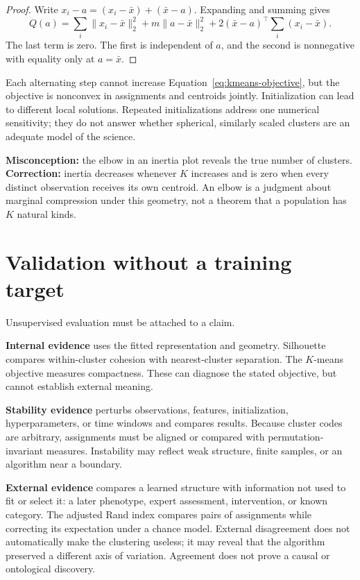 \begin{proof}
Write $x_i-a=(x_i-\bar x)+(\bar x-a)$. Expanding and summing gives
\[
Q(a)=\sum_i\lVert x_i-\bar x\rVert_2^2
+m\lVert a-\bar x\rVert_2^2
+2(\bar x-a)^\top\sum_i(x_i-\bar x).
\]
The last term is zero. The first is independent of $a$, and the second is
nonnegative with equality only at $a=\bar x$.
\end{proof}

Each alternating step cannot increase Equation~\eqref{eq:kmeans-objective}, but
the objective is nonconvex in assignments and centroids jointly. Initialization
can lead to different local solutions. Repeated initializations address one
numerical sensitivity; they do not answer whether spherical, similarly scaled
clusters are an adequate model of the science.

\begin{misconceptionbox}
\textbf{Misconception:} the elbow in an inertia plot reveals the true number of
clusters. \textbf{Correction:} inertia decreases whenever $K$ increases and is
zero when every distinct observation receives its own centroid. An elbow is a
judgment about marginal compression under this geometry, not a theorem that a
population has $K$ natural kinds.
\end{misconceptionbox}

\section{Validation without a training target}

Unsupervised evaluation must be attached to a claim.

\textbf{Internal evidence} uses the fitted representation and geometry.
Silhouette compares within-cluster cohesion with nearest-cluster separation.
The $K$-means objective measures compactness. These can diagnose the stated
objective, but cannot establish external meaning.

\textbf{Stability evidence} perturbs observations, features, initialization,
hyperparameters, or time windows and compares results. Because cluster codes
are arbitrary, assignments must be aligned or compared with permutation-
invariant measures. Instability may reflect weak structure, finite samples, or
an algorithm near a boundary.

\textbf{External evidence} compares a learned structure with information not
used to fit or select it: a later phenotype, expert assessment, intervention,
or known category. The adjusted Rand index compares pairs of assignments while
correcting its expectation under a chance model. External disagreement does
not automatically make the clustering useless; it may reveal that the
algorithm preserved a different axis of variation. Agreement does not prove a
causal or ontological discovery.

